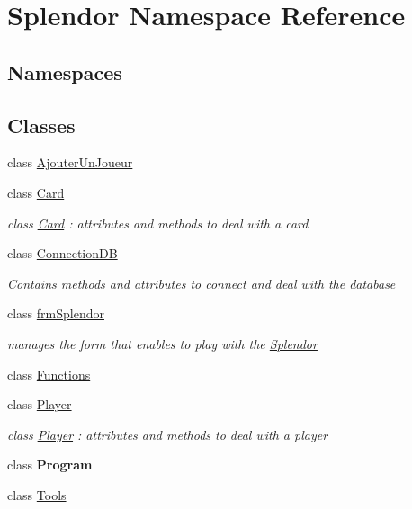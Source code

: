 \hypertarget{namespace_splendor}{}\section{Splendor Namespace Reference}
\label{namespace_splendor}
\subsection*{Namespaces}
\begin{DoxyCompactItemize}
\end{DoxyCompactItemize}
\subsection*{Classes}
\begin{DoxyCompactItemize}
\item 
class \hyperlink{class_splendor_1_1_ajouter_un_joueur}{Ajouter\+Un\+Joueur}
\item 
class \hyperlink{class_splendor_1_1_card}{Card}
\begin{DoxyCompactList}\small\item\em class \hyperlink{class_splendor_1_1_card}{Card} \+: attributes and methods to deal with a card \end{DoxyCompactList}\item 
class \hyperlink{class_splendor_1_1_connection_d_b}{Connection\+DB}
\begin{DoxyCompactList}\small\item\em Contains methods and attributes to connect and deal with the database \end{DoxyCompactList}\item 
class \hyperlink{class_splendor_1_1frm_splendor}{frm\+Splendor}
\begin{DoxyCompactList}\small\item\em manages the form that enables to play with the \hyperlink{namespace_splendor}{Splendor} \end{DoxyCompactList}\item 
class \hyperlink{class_splendor_1_1_functions}{Functions}
\item 
class \hyperlink{class_splendor_1_1_player}{Player}
\begin{DoxyCompactList}\small\item\em class \hyperlink{class_splendor_1_1_player}{Player} \+: attributes and methods to deal with a player \end{DoxyCompactList}\item 
class {\bfseries Program}
\item 
class \hyperlink{class_splendor_1_1_tools}{Tools}
\end{DoxyCompactItemize}
